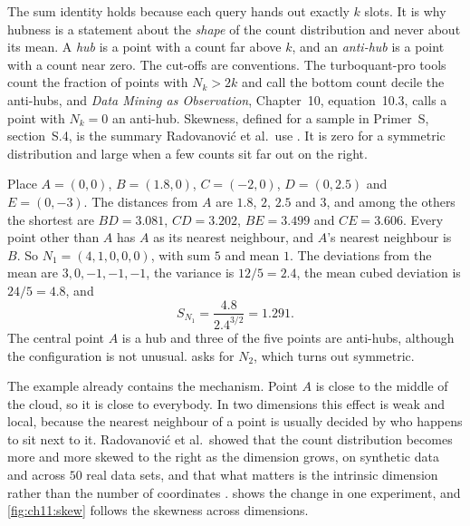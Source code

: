 The sum identity holds because each query hands out exactly $k$ slots. It is why hubness is a statement about the \emph{shape} of the count distribution and never about its mean. A \emph{hub} is a point with a count far above $k$, and an \emph{anti-hub} is a point with a count near zero. The cut-offs are conventions. The turboquant-pro tools count the fraction of points with $N_k>2k$ and call the bottom count decile the anti-hubs, and \emph{Data Mining as Observation}, Chapter~10, equation~10.3, calls a point with $N_k=0$ an anti-hub. Skewness, defined for a sample in Primer~S, section~S.4, is the summary Radovanovi\'c et al.\ use \cite{radovanovic2010}. It is zero for a symmetric distribution and large when a few counts sit far out on the right.

\begin{example}\label{ex:ch11:five}
Place $A=(0,0)$, $B=(1.8,0)$, $C=(-2,0)$, $D=(0,2.5)$ and $E=(0,-3)$. The distances from $A$ are $1.8$, $2$, $2.5$ and $3$, and among the others the shortest are $BD=3.081$, $CD=3.202$, $BE=3.499$ and $CE=3.606$. Every point other than $A$ has $A$ as its nearest neighbour, and $A$'s nearest neighbour is $B$. So $N_1=(4,1,0,0,0)$, with sum $5$ and mean $1$. The deviations from the mean are $3,0,-1,-1,-1$, the variance is $12/5=2.4$, the mean cubed deviation is $24/5=4.8$, and
\[
S_{N_1}=\frac{4.8}{2.4^{3/2}}=1.291 .
\]
The central point $A$ is a hub and three of the five points are anti-hubs, although the configuration is not unusual.  asks for $N_2$, which turns out symmetric.
\end{example}

The example already contains the mechanism. Point $A$ is close to the middle of the cloud, so it is close to everybody. In two dimensions this effect is weak and local, because the nearest neighbour of a point is usually decided by who happens to sit next to it. Radovanovi\'c et al.\ showed that the count distribution becomes more and more skewed to the right as the dimension grows, on synthetic data and across $50$ real data sets, and that what matters is the intrinsic dimension rather than the number of coordinates \cite{radovanovic2010}.  shows the change in one experiment, and \cref{fig:ch11:skew} follows the skewness across dimensions.

